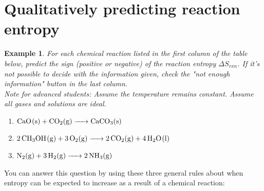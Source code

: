\documentclass{article}  %
\newtheorem{exmp}{Example}
\begin{document}
\section*{Qualitatively predicting reaction entropy}
\begin{exmp}
    For each chemical reaction listed in the first column of the table below, predict the sign (positive or negative) of the reaction entropy $\Delta S_{rxn}$. If it's not possible to decide with the information given, check the "not enough information" button in the last column. \\
    Note for advanced students: Assume the temperature remains constant. Assume all gases and solutions are ideal. 
    \begin{enumerate}
        \item $\ce{CaO_(s) + CO2_(g) -> CaCO3_(s)}$
        \item $\ce{2 CH3OH_(g) + 3 O2_(g) -> 2 CO2_(g) + 4 H2O_(l)}$
        \item $\ce{N2_(g) + 3 H2_(g) -> 2 NH3_(g)}$
    \end{enumerate}

\end{exmp}
You can answer this question by using these three general rules about when entropy can be expected to increase as a result of a chemical reaction:
\end{document}

